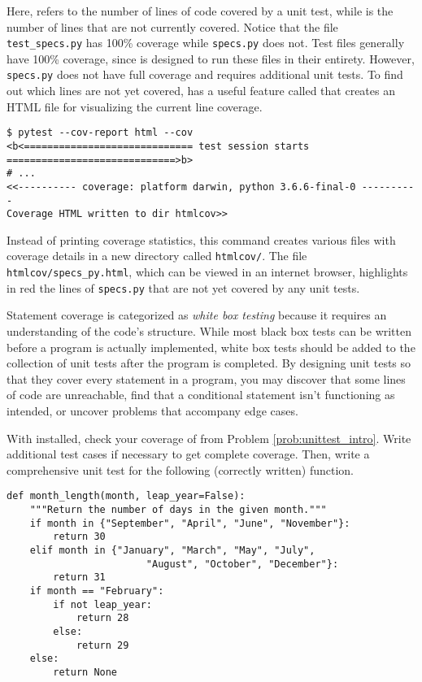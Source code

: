Here,  refers to the number of lines of code covered by a unit test, while  is the number of lines that are not currently covered.
Notice that the file \texttt{test\_specs.py} has 100\% coverage while \texttt{specs.py} does not.
Test files generally have 100\% coverage, since  is designed to run these files in their entirety.
However, \texttt{specs.py} does not have full coverage and requires additional unit tests.
To find out which lines are not yet covered,  has a useful feature called  that creates an HTML file for visualizing the current line coverage.

\begin{lstlisting}
$ pytest --cov-report html --cov
<b<============================= test session starts =============================>b>
# ...
<<---------- coverage: platform darwin, python 3.6.6-final-0 ----------
Coverage HTML written to dir htmlcov>>
\end{lstlisting}

Instead of printing coverage statistics, this command creates various files with coverage details in a new directory called \texttt{htmlcov/}.
The file \texttt{htmlcov/specs\_py.html}, which can be viewed in an internet browser, highlights in red the lines of \texttt{specs.py} that are not yet covered by any unit tests.

\begin{info} %
Statement coverage is categorized as \emph{white box testing} because it requires an understanding of the code's structure.
While most black box tests can be written before a program is actually implemented, white box tests should be added to the collection of unit tests after the program is completed.
By designing unit tests so that they cover every statement in a program, you may discover that some lines of code are unreachable, find that a conditional statement isn't functioning as intended, or uncover problems that accompany edge cases.
\end{info}

\begin{problem} %
With  installed, check your coverage of  from Problem \ref{prob:unittest_intro}.
Write additional test cases if necessary to get complete coverage.
Then, write a comprehensive unit test for the following (correctly written) function.

\begin{lstlisting}
def month_length(month, leap_year=False):
    """Return the number of days in the given month."""
    if month in {"September", "April", "June", "November"}:
        return 30
    elif month in {"January", "March", "May", "July",
                        "August", "October", "December"}:
        return 31
    if month == "February":
        if not leap_year:
            return 28
        else:
            return 29
    else:
        return None
\end{lstlisting}
\end{problem}

